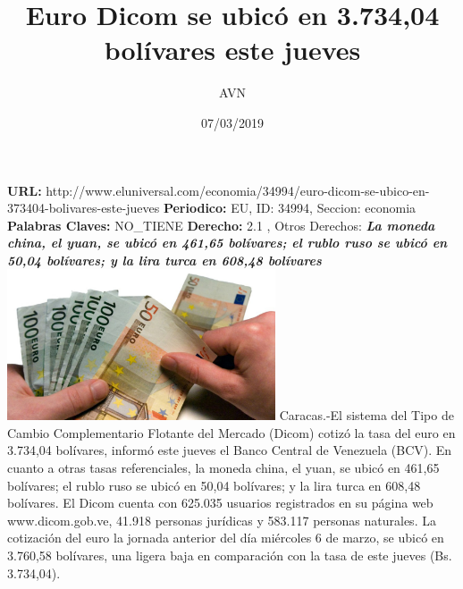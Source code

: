 \documentclass{article}%
\title{\textbf{Euro Dicom se ubicó en 3.734,04 bolívares este jueves}}%
\author{AVN}%
\date{07/03/2019}%
\begin{document}
%
\normalsize%
\maketitle%
\textbf{URL: }%
http://www.eluniversal.com/economia/34994/euro{-}dicom{-}se{-}ubico{-}en{-}373404{-}bolivares{-}este{-}jueves\newline%
%
\textbf{Periodico: }%
EU, %
ID: %
34994, %
Seccion: %
economia\newline%
%
\textbf{Palabras Claves: }%
NO\_TIENE\newline%
%
\textbf{Derecho: }%
2.1%
, Otros Derechos: %
\newline%
%
\textbf{\textit{La moneda china, el yuan, se ubicó en 461,65 bolívares; el rublo ruso se ubicó en 50,04 bolívares; y la lira turca en 608,48 bolívares}}%
\newline%
\newline%
%
\includegraphics[width=300px]{EU_34994.jpg}%
\newline%
%
Caracas.{-}El sistema del Tipo de Cambio Complementario Flotante del Mercado (Dicom) cotizó la tasa del euro en 3.734,04 bolívares, informó este jueves el Banco Central de Venezuela (BCV).%
\newline%
%
En cuanto a otras tasas referenciales, la moneda china, el yuan, se ubicó en 461,65 bolívares; el rublo ruso se ubicó en 50,04 bolívares; y la lira turca en 608,48 bolívares.%
\newline%
%
El Dicom cuenta con 625.035 usuarios registrados en su página web www.dicom.gob.ve, 41.918 personas jurídicas y 583.117 personas naturales.%
\newline%
%
La cotización del euro la jornada anterior del día miércoles 6 de marzo, se ubicó en 3.760,58 bolívares, una ligera baja en comparación con la tasa de este jueves (Bs. 3.734,04).%
\newline%
%
\end{document}
